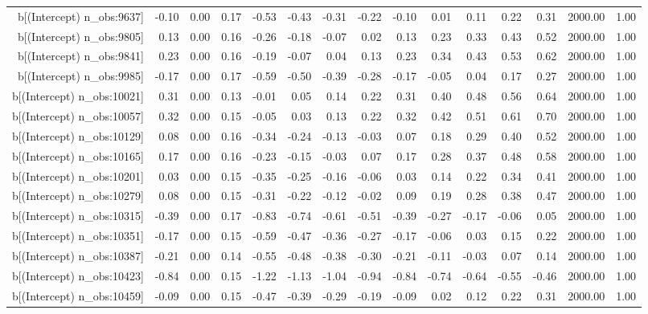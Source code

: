 \begin{table}[ht]
\begin{tabular}{rrrrrrrrrrrrrrr}
  b[(Intercept) n\_obs:9637] & -0.10 & 0.00 & 0.17 & -0.53 & -0.43 & -0.31 & -0.22 & -0.10 & 0.01 & 0.11 & 0.22 & 0.31 & 2000.00 & 1.00 \\ 
  b[(Intercept) n\_obs:9805] & 0.13 & 0.00 & 0.16 & -0.26 & -0.18 & -0.07 & 0.02 & 0.13 & 0.23 & 0.33 & 0.43 & 0.52 & 2000.00 & 1.00 \\ 
  b[(Intercept) n\_obs:9841] & 0.23 & 0.00 & 0.16 & -0.19 & -0.07 & 0.04 & 0.13 & 0.23 & 0.34 & 0.43 & 0.53 & 0.62 & 2000.00 & 1.00 \\ 
  b[(Intercept) n\_obs:9985] & -0.17 & 0.00 & 0.17 & -0.59 & -0.50 & -0.39 & -0.28 & -0.17 & -0.05 & 0.04 & 0.17 & 0.27 & 2000.00 & 1.00 \\ 
  b[(Intercept) n\_obs:10021] & 0.31 & 0.00 & 0.13 & -0.01 & 0.05 & 0.14 & 0.22 & 0.31 & 0.40 & 0.48 & 0.56 & 0.64 & 2000.00 & 1.00 \\ 
  b[(Intercept) n\_obs:10057] & 0.32 & 0.00 & 0.15 & -0.05 & 0.03 & 0.13 & 0.22 & 0.32 & 0.42 & 0.51 & 0.61 & 0.70 & 2000.00 & 1.00 \\ 
  b[(Intercept) n\_obs:10129] & 0.08 & 0.00 & 0.16 & -0.34 & -0.24 & -0.13 & -0.03 & 0.07 & 0.18 & 0.29 & 0.40 & 0.52 & 2000.00 & 1.00 \\ 
  b[(Intercept) n\_obs:10165] & 0.17 & 0.00 & 0.16 & -0.23 & -0.15 & -0.03 & 0.07 & 0.17 & 0.28 & 0.37 & 0.48 & 0.58 & 2000.00 & 1.00 \\ 
  b[(Intercept) n\_obs:10201] & 0.03 & 0.00 & 0.15 & -0.35 & -0.25 & -0.16 & -0.06 & 0.03 & 0.14 & 0.22 & 0.34 & 0.41 & 2000.00 & 1.00 \\ 
  b[(Intercept) n\_obs:10279] & 0.08 & 0.00 & 0.15 & -0.31 & -0.22 & -0.12 & -0.02 & 0.09 & 0.19 & 0.28 & 0.38 & 0.47 & 2000.00 & 1.00 \\ 
  b[(Intercept) n\_obs:10315] & -0.39 & 0.00 & 0.17 & -0.83 & -0.74 & -0.61 & -0.51 & -0.39 & -0.27 & -0.17 & -0.06 & 0.05 & 2000.00 & 1.00 \\ 
  b[(Intercept) n\_obs:10351] & -0.17 & 0.00 & 0.15 & -0.59 & -0.47 & -0.36 & -0.27 & -0.17 & -0.06 & 0.03 & 0.15 & 0.22 & 2000.00 & 1.00 \\ 
  b[(Intercept) n\_obs:10387] & -0.21 & 0.00 & 0.14 & -0.55 & -0.48 & -0.38 & -0.30 & -0.21 & -0.11 & -0.03 & 0.07 & 0.14 & 2000.00 & 1.00 \\ 
  b[(Intercept) n\_obs:10423] & -0.84 & 0.00 & 0.15 & -1.22 & -1.13 & -1.04 & -0.94 & -0.84 & -0.74 & -0.64 & -0.55 & -0.46 & 2000.00 & 1.00 \\ 
  b[(Intercept) n\_obs:10459] & -0.09 & 0.00 & 0.15 & -0.47 & -0.39 & -0.29 & -0.19 & -0.09 & 0.02 & 0.12 & 0.22 & 0.31 & 2000.00 & 1.00 \\ 

\end{tabular}
\end{table}
